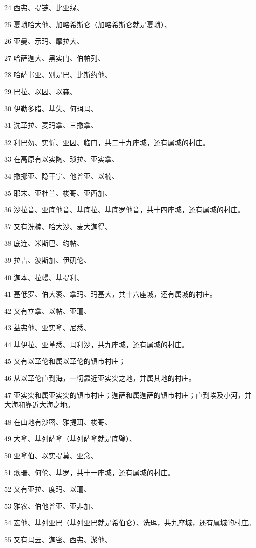 \par 24 西弗、提链、比亚绿、
\par 25 夏琐哈大他、加略希斯仑（加略希斯仑就是夏琐）、
\par 26 亚曼、示玛、摩拉大、
\par 27 哈萨迦大、黑实门、伯帕列、
\par 28 哈萨书亚、别是巴、比斯约他、
\par 29 巴拉、以因、以森、
\par 30 伊勒多腊、基失、何珥玛、
\par 31 洗革拉、麦玛拿、三撒拿、
\par 32 利巴勿、实忻、亚因、临门，共二十九座城，还有属城的村庄。
\par 33 在高原有以实陶、琐拉、亚实拿、
\par 34 撒挪亚、隐干宁、他普亚、以楠、
\par 35 耶末、亚杜兰、梭哥、亚西加、
\par 36 沙拉音、亚底他音、基底拉、基底罗他音，共十四座城，还有属城的村庄。
\par 37 又有洗楠、哈大沙、麦大迦得、
\par 38 底连、米斯巴、约帖、
\par 39 拉吉、波斯加、伊矶伦、
\par 40 迦本、拉幔、基提利、
\par 41 基低罗、伯大衮、拿玛、玛基大，共十六座城，还有属城的村庄。
\par 42 又有立拿、以帖、亚珊、
\par 43 益弗他、亚实拿、尼悉、
\par 44 基伊拉、亚革悉、玛利沙，共九座城，还有属城的村庄。
\par 45 又有以革伦和属以革伦的镇市村庄；
\par 46 从以革伦直到海，一切靠近亚实突之地，并属其地的村庄。
\par 47 亚实突和属亚实突的镇市村庄；迦萨和属迦萨的镇市村庄；直到埃及小河，并大海和靠近大海之地。
\par 48 在山地有沙密、雅提珥、梭哥、
\par 49 大拿、基列萨拿（基列萨拿就是底璧）、
\par 50 亚拿伯、以实提莫、亚念、
\par 51 歌珊、何伦、基罗，共十一座城，还有属城的村庄。
\par 52 又有亚拉、度玛、以珊、
\par 53 雅农、伯他普亚、亚非加、
\par 54 宏他、基列亚巴（基列亚巴就是希伯仑）、洗珥，共九座城，还有属城的村庄。
\par 55 又有玛云、迦密、西弗、淤他、
